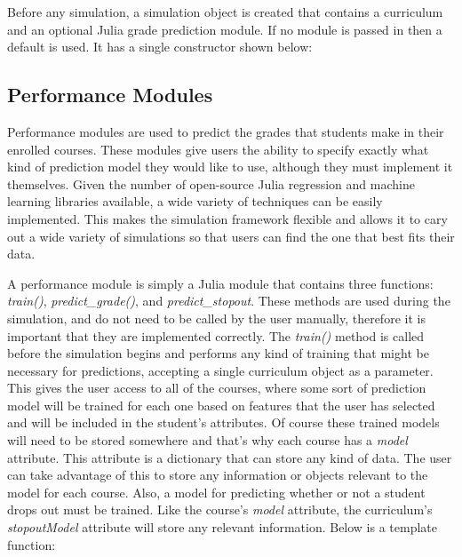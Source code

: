 \documentclass[botnum, fleqn]{unmeethesis}
\begin{document}
    Before any simulation, a simulation object is created that contains a curriculum and an optional Julia grade prediction module. If no module is passed in then a default is used. It has a single constructor shown below:

    

  
  \subsection{Performance Modules}
  Performance modules are used to predict the grades that students make in their enrolled courses. These modules give users the ability to specify exactly what kind of prediction model they would like to use, although they must implement it themselves. Given the number of open-source Julia regression and machine learning libraries available, a wide variety of techniques can be easily implemented. This makes the simulation framework flexible and allows it to cary out a wide variety of simulations so that users can find the one that best fits their data. 

  A performance module is simply a Julia module that contains three functions: \textit{train()}, \textit{predict\_grade()}, and \textit{predict\_stopout}. These methods are used during the simulation, and do not need to be called by the user manually, therefore it is important that they are implemented correctly. The \textit{train()} method is called before the simulation begins and performs any kind of training that might be necessary for predictions, accepting a single curriculum object as a parameter. This gives the user access to all of the courses, where some sort of prediction model will be trained for each one based on features that the user has selected and will be included in the student's attributes. Of course these trained models will need to be stored somewhere and that's why each course has a \textit{model} attribute. This attribute is a dictionary that can store any kind of data. The user can take advantage of this to store any information or objects relevant to the model for each course. Also, a model for predicting whether or not a student drops out must be trained. Like the course's \textit{model} attribute, the curriculum's \textit{stopoutModel} attribute will store any relevant information. Below is a template function:
\end{document}
